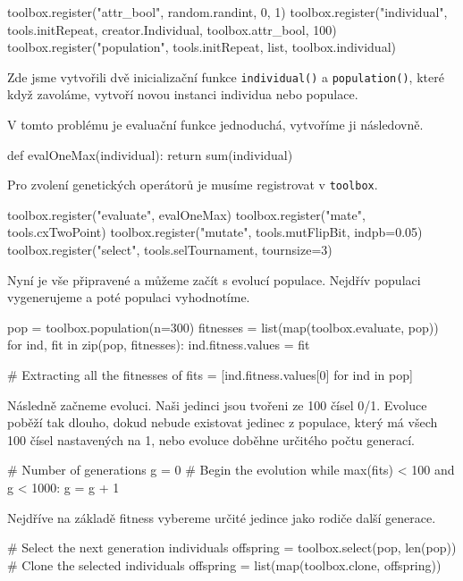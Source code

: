\begin{itemize}
\begin{code}
toolbox.register("attr_bool", random.randint, 0, 1)
toolbox.register("individual", tools.initRepeat, 
                 creator.Individual, toolbox.attr_bool, 100)
toolbox.register("population", tools.initRepeat, 
                 list, toolbox.individual)
\end{code}
        
        Zde jsme vytvořili dvě inicializační funkce \texttt{individual()} a
        \texttt{population()}, které když zavoláme, vytvoří novou instanci
        individua nebo populace.

        V tomto problému je evaluační funkce jednoduchá, vytvoříme ji
        následovně.
\begin{code}
def evalOneMax(individual):
    return sum(individual)
\end{code}
        
        Pro zvolení genetických operátorů je musíme registrovat v
        \texttt{toolbox}.
\begin{code}
toolbox.register("evaluate", evalOneMax)
toolbox.register("mate", tools.cxTwoPoint)
toolbox.register("mutate", tools.mutFlipBit, indpb=0.05)
toolbox.register("select", tools.selTournament, tournsize=3)
\end{code}
        
        Nyní je vše připravené a můžeme začít s evolucí populace. Nejdřív
        populaci vygenerujeme a poté populaci vyhodnotíme.
\begin{code}
pop = toolbox.population(n=300)
fitnesses = list(map(toolbox.evaluate, pop))
for ind, fit in zip(pop, fitnesses):
    ind.fitness.values = fit

# Extracting all the fitnesses of 
fits = [ind.fitness.values[0] for ind in pop]
\end{code}

        Následně začneme evoluci. Naši jedinci jsou tvořeni ze 100 čísel 0/1.
        Evoluce poběží tak dlouho, dokud nebude existovat jedinec z populace,
        který má všech 100 čísel nastavených na 1, nebo evoluce doběhne
        určitého počtu generací.
\begin{code}
# Number of generations
g = 0
# Begin the evolution
while max(fits) < 100 and g < 1000:
    g = g + 1
\end{code}
        
        Nejdříve na základě fitness vybereme určité jedince jako rodiče další
        generace.
\begin{code}
    # Select the next generation individuals
    offspring = toolbox.select(pop, len(pop))
    # Clone the selected individuals
    offspring = list(map(toolbox.clone, offspring))
\end{code}


\end{itemize}
